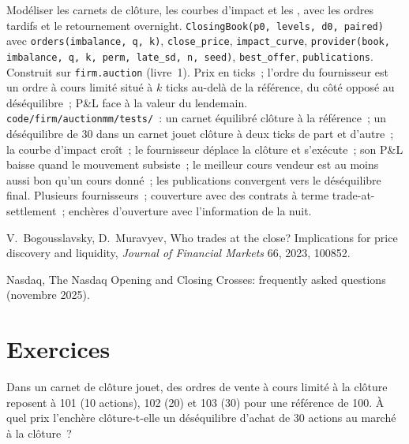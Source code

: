 \begin{build}
 Modéliser les carnets de clôture, les courbes d'impact et les , avec les ordres tardifs et le retournement overnight.
 \texttt{ClosingBook(p0, levels, d0, paired)} avec \texttt{orders(imbalance, q, k)}, \texttt{close\_price}, \texttt{impact\_curve},
\texttt{provider(book, imbalance, q, k, perm, late\_sd, n, seed)}, \texttt{best\_offer}, \texttt{publications}. Construit sur \texttt{firm.auction}
(livre~1).
 Prix en ticks~; l'ordre du fournisseur est un ordre à cours limité situé à $k$ ticks au-delà de la référence, du côté opposé au déséquilibre~; P\&L face
à la valeur du lendemain.
 \texttt{code/firm/auctionmm/tests/}~: un carnet équilibré clôture à la référence~; un déséquilibre de 30 dans un carnet jouet clôture à deux
ticks de part et d'autre~; la courbe d'impact croît~; le fournisseur déplace la clôture et s'exécute~; son P\&L baisse quand le mouvement subsiste~; le meilleur cours vendeur est
au moins aussi bon qu'un cours donné~; les publications convergent vers le déséquilibre final.
 Plusieurs fournisseurs~; couverture avec des contrats à terme trade-at-settlement~; enchères d'ouverture avec l'information de la nuit.
\end{build}

\begin{omsources}
\item V.~Bogousslavsky, D.~Muravyev, Who trades at the close? Implications for price discovery and liquidity, \emph{Journal of Financial
Markets} 66, 2023, 100852.
\item Nasdaq, The Nasdaq Opening and Closing Crosses: frequently asked questions (novembre 2025).
\end{omsources}

\section{Exercices}

\begin{exercise}[$\star$]\label{exo:hf:auctions-and-the-close:1}
Dans un carnet de clôture jouet, des ordres de vente à cours limité à la clôture reposent à 101 (10 actions), 102 (20) et 103 (30) pour une référence de 100. À quel
prix l'enchère clôture-t-elle un déséquilibre d'achat de 30 actions au marché à la clôture~?
\end{exercise}


